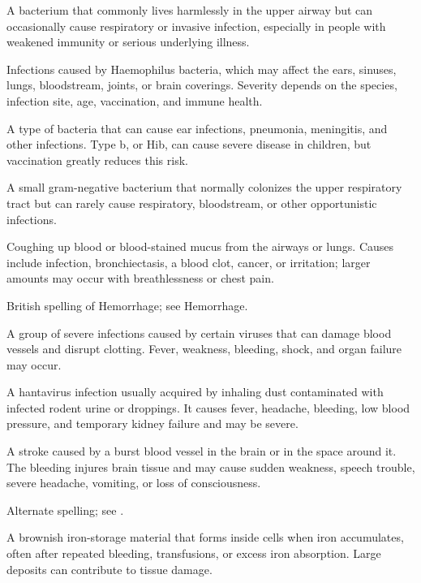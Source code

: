  A bacterium that commonly lives harmlessly in the upper airway but can occasionally cause respiratory or invasive infection, especially in people with weakened immunity or serious underlying illness.

 Infections caused by Haemophilus bacteria, which may affect the ears, sinuses, lungs, bloodstream, joints, or brain coverings. Severity depends on the species, infection site, age, vaccination, and immune health.

 A type of bacteria that can cause ear infections, pneumonia, meningitis, and other infections. Type b, or Hib, can cause severe disease in children, but vaccination greatly reduces this risk.

 A small gram-negative bacterium that normally colonizes the upper respiratory tract but can rarely cause respiratory, bloodstream, or other opportunistic infections.

 Coughing up blood or blood-stained mucus from the airways or lungs. Causes include infection, bronchiectasis, a blood clot, cancer, or irritation; larger amounts may occur with breathlessness or chest pain.

 British spelling of Hemorrhage; see Hemorrhage.

 A group of severe infections caused by certain viruses that can damage blood vessels and disrupt clotting. Fever, weakness, bleeding, shock, and organ failure may occur.

 A hantavirus infection usually acquired by inhaling dust contaminated with infected rodent urine or droppings. It causes fever, headache, bleeding, low blood pressure, and temporary kidney failure and may be severe.

 A stroke caused by a burst blood vessel in the brain or in the space around it. The bleeding injures brain tissue and may cause sudden weakness, speech trouble, severe headache, vomiting, or loss of consciousness.

 Alternate spelling; see .

 A brownish iron-storage material that forms inside cells when iron accumulates, often after repeated bleeding, transfusions, or excess iron absorption. Large deposits can contribute to tissue damage.

